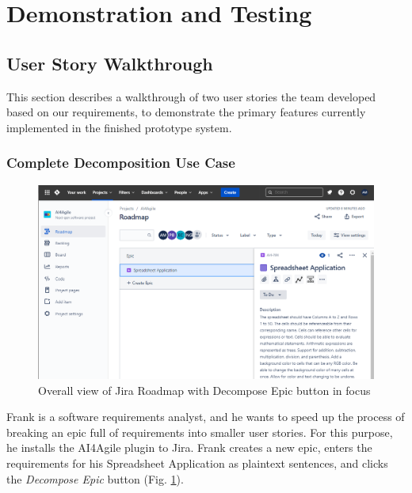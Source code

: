 \section{Demonstration and Testing}
\label{demo}

\subsection{User Story Walkthrough}
\label{walkthrough}

This section describes a walkthrough of two user stories the team developed based on our requirements, to demonstrate the primary features currently implemented in the finished prototype system. 

\subsubsection{Complete Decomposition Use Case}
\label{Scenario1}

\begin{figure}
\centering
\includegraphics[width=\textwidth,keepaspectratio]{./figure/Scenario1Figure1.png}
\caption{Overall view of Jira Roadmap with Decompose Epic button in focus}
\label{fig:Scenario1Figure1}
\end{figure}

Frank is a software requirements analyst, and he wants to speed up the process of breaking an epic full of requirements into smaller user stories. For this purpose, he installs the AI4Agile plugin to Jira. Frank creates a new epic, enters the requirements for his Spreadsheet Application as plaintext sentences, and clicks the \emph{Decompose Epic} button (Fig. \ref{fig:Scenario1Figure1}).

